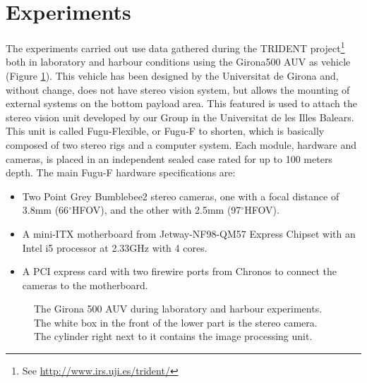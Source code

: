 \documentclass[conference]{IEEEtran}
\newcommand{\degree}{\ensuremath{^\circ}}
\begin{document}
\section{Experiments
  \label{experiments}
}

The experiments carried out use data gathered during the TRIDENT project\footnote{See \url{http://www.irs.uji.es/trident/}} both in laboratory and harbour conditions using the Girona500 AUV \cite{Ribas2012} as vehicle (Figure \ref{g500}). This vehicle has been designed by the Universitat de Girona and, without change, does not have stereo vision system, but allows the mounting of external systems on the bottom payload area. This featured is used to attach the stereo vision unit developed by our Group in the Universitat de les Illes Balears. This unit is called Fugu-Flexible, or Fugu-F to shorten, which is basically composed of two stereo rigs and a computer system. Each module, hardware and cameras, is placed in an independent sealed case rated for up to 100 meters depth. The main Fugu-F hardware specifications are:

\begin{itemize}
  \item Two Point Grey Bumblebee2 stereo cameras, one with a focal distance of 3.8mm (66\degree HFOV), and the other with 2.5mm (97\degree HFOV). %
  \item A mini-ITX motherboard from Jetway-NF98-QM57 Express Chipset with an Intel i5 processor at 2.33GHz with 4 cores.
  \item A PCI express card with two firewire ports from Chronos to connect the cameras to the motherboard.
\end{itemize}

\begin{figure}
  \noindent{}
  \caption{The Girona 500 AUV during laboratory and harbour experiments. The white box in the front of the lower part is the stereo camera. The cylinder right next to it contains the image processing unit.}
  \label{g500}
\end{figure}
\end{document}
